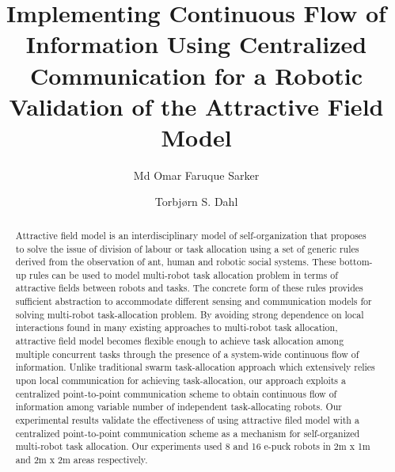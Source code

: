 \documentclass[smallcondensed]{svjour3}
\begin{document}
\title{Implementing Continuous Flow of Information Using Centralized Communication for a Robotic Validation of the Attractive Field Model}
\author{Md Omar Faruque Sarker \and
Torbj{\o}rn S. Dahl %
}
\maketitle
\begin{abstract}
Attractive field model is an interdisciplinary model of self-organization that proposes to solve the issue of division of labour or task allocation using a set of generic rules derived from the observation of ant, human and robotic social systems. These bottom-up rules can be used to model multi-robot task allocation problem in terms of attractive fields between robots and tasks. The concrete form of these rules provides sufficient abstraction to accommodate different sensing and communication models for solving multi-robot task-allocation problem. By avoiding strong dependence on local interactions found in many existing approaches to multi-robot task allocation, attractive field model becomes flexible enough to achieve task allocation among multiple concurrent tasks through the presence of a system-wide continuous flow of information. Unlike traditional swarm task-allocation approach which extensively relies upon local communication for achieving task-allocation, our approach exploits a centralized point-to-point communication scheme to obtain continuous flow of information among variable number of independent task-allocating robots. Our experimental results validate the effectiveness of using attractive filed model with a centralized point-to-point communication scheme as a mechanism for self-organized multi-robot task allocation. Our experiments used 8 and 16 e-puck robots in 2m x 1m and 2m x 2m areas respectively.
\end{abstract}
\end{document}
